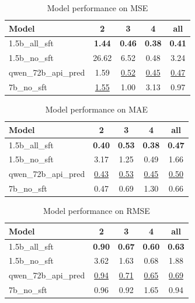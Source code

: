 \begin{table}[ht]
\centering
\begin{tabular}{lcccc}
\toprule
Model & 2 & 3 & 4 & all \\
\midrule
1.5b\_all\_sft & \textbf{1.44} & \textbf{0.46} & \textbf{0.38} & \textbf{0.41} \\
1.5b\_no\_sft & 26.62 & 6.52 & 0.48 & 3.24 \\
qwen\_72b\_api\_pred & 1.59 & \underline{0.52} & \underline{0.45} & \underline{0.47} \\
7b\_no\_sft & \underline{1.55} & 1.00 & 3.13 & 0.97 \\
\bottomrule
\end{tabular}
\caption{Model performance on MSE}
\label{tab:mse}
\end{table}

\begin{table}[ht]
\centering
\begin{tabular}{lcccc}
\toprule
Model & 2 & 3 & 4 & all \\
\midrule
1.5b\_all\_sft & \textbf{0.40} & \textbf{0.53} & \textbf{0.38} & \textbf{0.47} \\
1.5b\_no\_sft & 3.17 & 1.25 & 0.49 & 1.66 \\
qwen\_72b\_api\_pred & \underline{0.43} & \underline{0.53} & \underline{0.45} & \underline{0.50} \\
7b\_no\_sft & 0.47 & 0.69 & 1.30 & 0.66 \\
\bottomrule
\end{tabular}
\caption{Model performance on MAE}
\label{tab:mae}
\end{table}

\begin{table}[ht]
\centering
\begin{tabular}{lcccc}
\toprule
Model & 2 & 3 & 4 & all \\
\midrule
1.5b\_all\_sft & \textbf{0.90} & \textbf{0.67} & \textbf{0.60} & \textbf{0.63} \\
1.5b\_no\_sft & 3.62 & 1.63 & 0.68 & 1.88 \\
qwen\_72b\_api\_pred & \underline{0.94} & \underline{0.71} & \underline{0.65} & \underline{0.69} \\
7b\_no\_sft & 0.96 & 0.92 & 1.65 & 0.94 \\
\bottomrule
\end{tabular}
\caption{Model performance on RMSE}
\label{tab:rmse}
\end{table}

